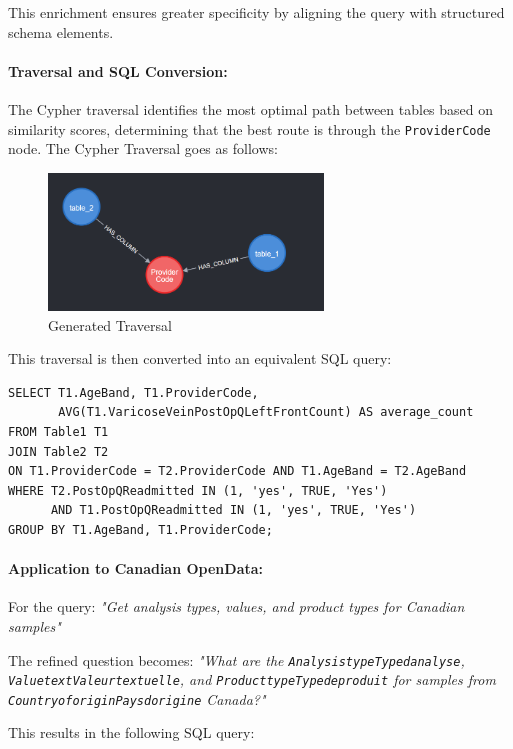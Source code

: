 This enrichment ensures greater specificity by aligning the query with structured schema elements.

\paragraph{Traversal and SQL Conversion:}
The Cypher traversal identifies the most optimal path between tables based on similarity scores, determining that the best route is through the \texttt{ProviderCode} node. 
The Cypher Traversal goes as follows:

\begin{figure}[h]
    \centering
\includegraphics[width=0.65\textwidth]{IMAGES/immagine_2025-03-28_082503566.png}
    \caption{Generated Traversal}
    \label{fig:Traversal}
\end{figure}

This traversal is then converted into an equivalent SQL query:

\begin{verbatim}
SELECT T1.AgeBand, T1.ProviderCode, 
       AVG(T1.VaricoseVeinPostOpQLeftFrontCount) AS average_count
FROM Table1 T1
JOIN Table2 T2
ON T1.ProviderCode = T2.ProviderCode AND T1.AgeBand = T2.AgeBand
WHERE T2.PostOpQReadmitted IN (1, 'yes', TRUE, 'Yes') 
      AND T1.PostOpQReadmitted IN (1, 'yes', TRUE, 'Yes')
GROUP BY T1.AgeBand, T1.ProviderCode;
\end{verbatim}

\paragraph{Application to Canadian OpenData:}
For the query:  
\textit{"Get analysis types, values, and product types for Canadian samples"}  

The refined question becomes:  
\textit{"What are the \texttt{AnalysistypeTypedanalyse}, \texttt{ValuetextValeurtextuelle}, and \texttt{ProducttypeTypedeproduit} for samples from \texttt{CountryoforiginPaysdorigine} Canada?"}  

This results in the following SQL query:

